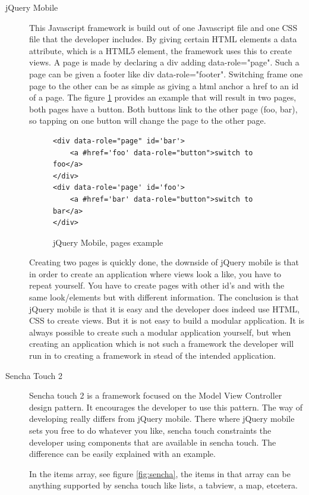 \begin{description}
\item [jQuery Mobile]
This Javascript framework is build out of one Javascript file and one CSS file that the developer includes. By giving certain HTML elements a data attribute, which is a HTML5 element, the framework uses this to create views. A page is made by declaring a div adding data-role="page". Such a page can be given a footer like div data-role="footer". 
Switching frame one page to the other can be as simple as giving a html anchor a href to an id of a page. The figure \ref{fig:jquery} provides an example that will result in two pages, both pages have a button. Both buttons link to the other page (foo, bar), so tapping on one button will change the page to the other page.
\begin{figure}
\begin{lstlisting}
<div data-role="page" id='bar'>
	<a #href='foo' data-role="button">switch to foo</a>
</div>
<div data-role='page' id='foo'>
	<a #href='bar' data-role="button">switch to bar</a>
</div>
\end{lstlisting}
\caption{jQuery Mobile, pages example}
\label{fig:jquery}
\end{figure}

Creating two pages is quickly done, the downside of jQuery mobile is that in order to create an application where views look a like, you have to repeat yourself. You have to create pages with other id's and with the same look/elements but with different information. The conclusion is that jQuery mobile is that it is easy and the developer does indeed use HTML, CSS to create views.  But it is not easy to build a modular application. It is always possible to create such a modular application yourself, but when creating an application which is not such a framework the developer will run in to creating a framework in stead of the intended application.

\item [Sencha Touch 2]
Sencha touch 2 is a framework focused on the Model View Controller design pattern. It encourages the developer to use this pattern. The way of developing really differs from jQuery mobile. There where jQuery mobile sets you free to do whatever you like, sencha touch constraints the developer using components that are available in sencha touch. The difference can be easily explained with an example.

In the items array, see figure \ref{fig:sencha}, the items in that array can be anything supported by sencha touch like lists, a tabview, a map, etcetera. 


\end{description}
